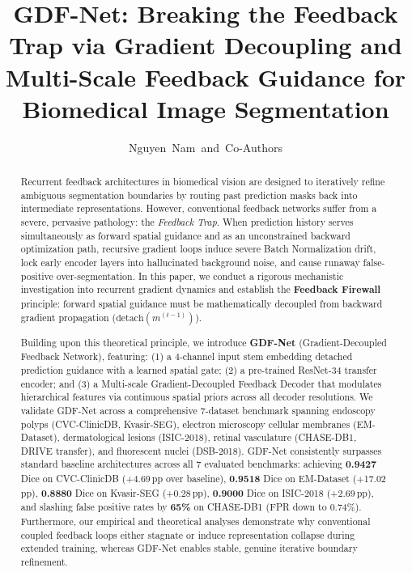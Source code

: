 \documentclass[journal, 10pt]{IEEEtran}
\begin{document}
\title{GDF-Net: Breaking the Feedback Trap via Gradient Decoupling and Multi-Scale Feedback Guidance for Biomedical Image Segmentation}

\author{%
  Nguyen~Nam~and~Co-Authors%
}

\maketitle

\begin{abstract}
Recurrent feedback architectures in biomedical vision are designed to iteratively refine ambiguous segmentation boundaries by routing past prediction masks back into intermediate representations. However, conventional feedback networks suffer from a severe, pervasive pathology: the \textit{Feedback Trap}. When prediction history serves simultaneously as forward spatial guidance and as an unconstrained backward optimization path, recursive gradient loops induce severe Batch Normalization drift, lock early encoder layers into hallucinated background noise, and cause runaway false-positive over-segmentation. In this paper, we conduct a rigorous mechanistic investigation into recurrent gradient dynamics and establish the \textbf{Feedback Firewall} principle: forward spatial guidance must be mathematically decoupled from backward gradient propagation ($\text{detach}(m^{(t-1)})$).

Building upon this theoretical principle, we introduce \textbf{GDF-Net} (Gradient-Decoupled Feedback Network), featuring: (1) a 4-channel input stem embedding detached prediction guidance with a learned spatial gate; (2) a pre-trained ResNet-34 transfer encoder; and (3) a Multi-scale Gradient-Decoupled Feedback Decoder that modulates hierarchical features via continuous spatial priors across all decoder resolutions. We validate GDF-Net across a comprehensive 7-dataset benchmark spanning endoscopy polyps (CVC-ClinicDB, Kvasir-SEG), electron microscopy cellular membranes (EM-Dataset), dermatological lesions (ISIC-2018), retinal vasculature (CHASE-DB1, DRIVE transfer), and fluorescent nuclei (DSB-2018). GDF-Net consistently surpasses standard baseline architectures across all 7 evaluated benchmarks: achieving \textbf{0.9427} Dice on CVC-ClinicDB (+4.69\,pp over baseline), \textbf{0.9518} Dice on EM-Dataset (+17.02\,pp), \textbf{0.8880} Dice on Kvasir-SEG (+0.28\,pp), \textbf{0.9000} Dice on ISIC-2018 (+2.69\,pp), and slashing false positive rates by \textbf{65\%} on CHASE-DB1 (FPR down to 0.74\%). Furthermore, our empirical and theoretical analyses demonstrate why conventional coupled feedback loops either stagnate or induce representation collapse during extended training, whereas GDF-Net enables stable, genuine iterative boundary refinement.
\end{abstract}
\end{document}
